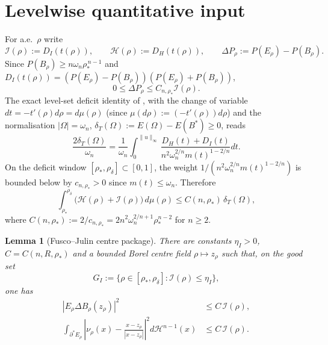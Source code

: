 \documentclass[11pt]{article}
\newtheorem{lemma}[theorem]{Lemma}
\theoremstyle{definition}
\newcommand{\Om}{\Omega}
\newcommand{\rstar}{\rho_{*}}
\begin{document}
\section{Levelwise quantitative input}\label{sec:FJ}

For a.e.\ $\rho$ write
\[
   \mathcal I(\rho):=D_I(t(\rho)),\qquad
   \mathcal H(\rho):=D_H(t(\rho)),\qquad
   \Delta P_\rho:=P(E_\rho)-P(B_\rho).
\]
Since $P(B_\rho)\ge n\omega_n\rstar^{\,n-1}$ and
$D_I(t(\rho))=(P(E_\rho)-P(B_\rho))(P(E_\rho)+P(B_\rho))$,
\begin{equation}\label{eq:DP-DI}
   0\le \Delta P_\rho\le C_{n,\rstar}\mathcal I(\rho).
\end{equation}
The exact level-set deficit identity of
\cite[Eq.~(eq:main), Thm.~5.1]{LevelSetIdentity}, with the change of
variable $dt=-t'(\rho)d\rho=d\mu(\rho)$ (since
$\mu(d\rho):=(-t'(\rho))d\rho$) and the normalisation $|\Om|=\omega_n$,
$\delta_T(\Om):=E(\Om)-E(B^*)\ge 0$, reads
\[
   \frac{2\delta_T(\Om)}{\omega_n}
   =\frac{1}{\omega_n}\int_{0}^{\|u\|_\infty}
   \frac{D_H(t)+D_I(t)}{n^2\omega_n^{2/n}m(t)^{1-2/n}}dt.
\]
On the deficit window $[\rstar,\rho_\delta]\subset[0,1]$, the weight
$1/(n^2\omega_n^{2/n}m(t)^{1-2/n})$ is bounded below by
$c_{n,\rstar}>0$ since $m(t)\le \omega_n$.  Therefore
\begin{equation}\label{eq:DH-DI-int}
   \int_{\rstar}^{\rho_\delta}\bigl(\mathcal H(\rho)+\mathcal I(\rho)\bigr)\,
   d\mu(\rho)\le C(n,\rstar)\,\delta_T(\Om),
\end{equation}
where $C(n,\rstar):=2/c_{n,\rstar}=2n^2\omega_n^{2/n+1}\rstar^{n-2}$ for
$n\ge 2$.

\begin{lemma}[Fusco--Julin centre package]\label{lem:FJ-package}
There are constants $\eta_I>0$, $C=C(n,R,\rstar)$ and a bounded Borel centre
field $\rho\mapsto z_\rho$ such that, on the good set
\[
   G_I:=\{\rho\in[\rstar,\rho_\delta]:\mathcal I(\rho)\le\eta_I\},
\]
one has
\begin{align}
   |E_\rho\Delta B_\rho(z_\rho)|^2
      &\le C\,\mathcal I(\rho),\label{eq:FJ-asym}\\
   \int_{\partial^*E_\rho}
      \left|\nu_\rho(x)-\frac{x-z_\rho}{|x-z_\rho|}\right|^2
      d\mathcal H^{n-1}(x)
      &\le C\,\mathcal I(\rho).\label{eq:FJ-normal}
\end{align}
\end{lemma}
\end{document}
